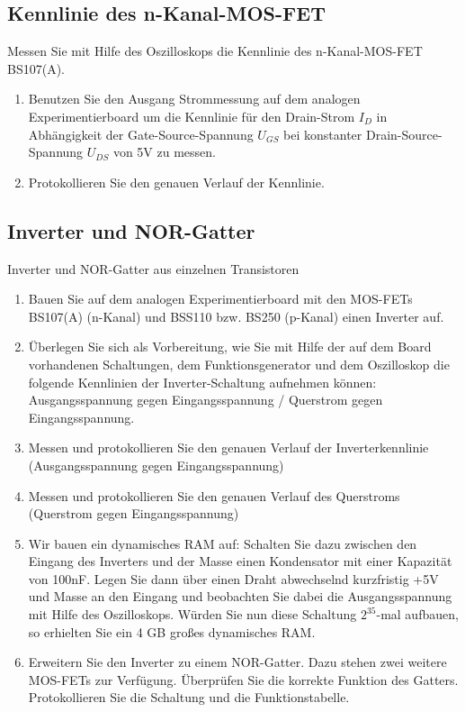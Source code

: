 \documentclass[paper=a4, fontsize=11pt]{scrartcl}
\numberwithin{equation}{section}
\numberwithin{figure}{section}
\numberwithin{table}{section}
\begin{document}
\subsection{Kennlinie des n-Kanal-MOS-FET}

Messen Sie mit Hilfe des Oszilloskops die Kennlinie des n-Kanal-MOS-FET BS107(A). \\

\begin{enumerate}
\item Benutzen Sie den Ausgang Strommessung auf dem analogen Experimentierboard um die Kennlinie für den Drain-Strom $I_{D}$ in Abhängigkeit der Gate-Source-Spannung $U_{GS}$ bei konstanter Drain-Source-Spannung $U_{DS}$ von 5V  zu messen.
\item Protokollieren Sie den genauen Verlauf der Kennlinie.
\end{enumerate}

\subsection{Inverter und NOR-Gatter}

Inverter und NOR-Gatter aus einzelnen Transistoren \\

\begin{enumerate}
\item Bauen Sie auf dem analogen Experimentierboard mit den MOS-FETs BS107(A) (n-Kanal) und BSS110 bzw. BS250 (p-Kanal) einen Inverter auf.
\item Überlegen Sie sich als Vorbereitung, wie Sie mit Hilfe der auf dem Board vorhandenen Schaltungen, dem Funktionsgenerator und dem Oszilloskop die folgende Kennlinien der Inverter-Schaltung aufnehmen können: Ausgangsspannung gegen Eingangsspannung / Querstrom gegen Eingangsspannung.
\item Messen und protokollieren Sie den genauen Verlauf der Inverterkennlinie (Ausgangsspannung gegen Eingangsspannung)
\item Messen und protokollieren Sie den genauen Verlauf des Querstroms (Querstrom gegen Eingangsspannung)
\item Wir bauen ein dynamisches RAM auf: Schalten Sie dazu zwischen den Eingang des Inverters und der Masse einen Kondensator mit einer Kapazität von 100nF. Legen Sie dann über einen Draht abwechselnd kurzfristig +5V und Masse an den Eingang und beobachten Sie dabei die Ausgangsspannung mit Hilfe des Oszilloskops. Würden Sie nun diese Schaltung $2^{35}$-mal aufbauen, so erhielten Sie ein 4 GB großes dynamisches RAM.
\item Erweitern Sie den Inverter zu einem NOR-Gatter. Dazu stehen zwei weitere MOS-FETs zur Verfügung. Überprüfen Sie die korrekte Funktion des Gatters. Protokollieren Sie die Schaltung und die Funktionstabelle.
\end{enumerate}
\end{document}
